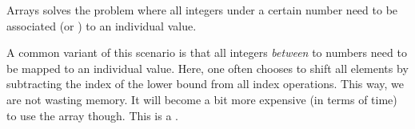 Arrays solves the problem where all integers under a certain number need to be associated (or ) to an individual value.

A common variant of this scenario is that all integers \textsl{between} to numbers need to be mapped to an individual value. Here, one often chooses to shift all elements by subtracting the index of the lower bound from all index operations. This way, we are not wasting memory. It will become a bit more expensive (in terms of time) to use the array though. This is a .


